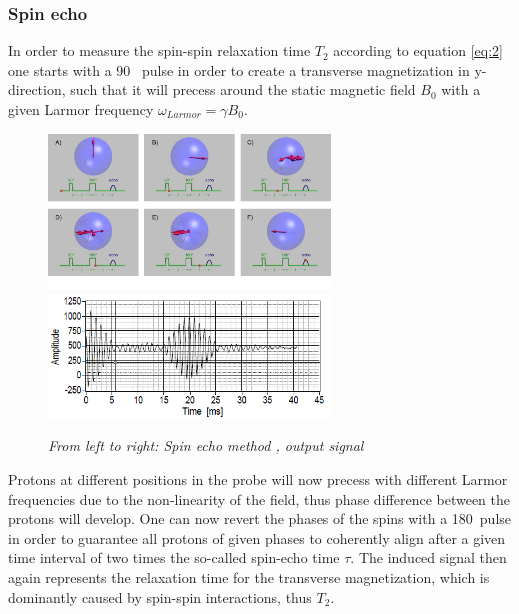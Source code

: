 \subsubsection{Spin echo} 
\label{sec:1} In order to measure the spin-spin relaxation time $T_2$ according to equation \ref{eq:2} one starts with a 90 \textdegree\, pulse in order to create a transverse magnetization in y-direction, such that it will precess around the static magnetic field $B_0$ with a given Larmor frequency $\omega_{Larmor} = \gamma B_0$.
\begin{figure}[h]
	\includegraphics[width=75mm
	]{Spinecho}
	\includegraphics[width=75mm]{Spinecho2}
	\centering
	\caption{\itshape From left to right: Spin echo method \cite{Spinecho}, output signal \cite{manual}}
	\label{fig:1}
\end{figure}
\newpage
\noindent
 Protons at different positions in the probe will now precess with different Larmor frequencies due to the non-linearity of the field, thus phase difference between the protons will develop.
One can now revert the phases of the spins with a 180\textdegree\, pulse in order to guarantee all protons of given phases to coherently align after a given time interval of two times the so-called spin-echo time $\tau$. The induced signal then again represents the relaxation time for the transverse magnetization, which is dominantly caused by spin-spin interactions, thus $T_2$. \cite{manual} \cite{MRI}

 


